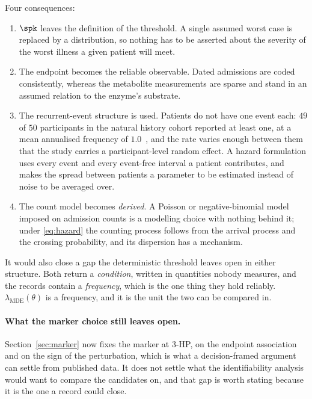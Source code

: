 Four consequences:

\begin{enumerate}[leftmargin=*, itemsep=2pt]
\item $\spk$ leaves the definition of the threshold. A single assumed worst case is
      replaced by a distribution, so nothing has to be asserted about the severity of the
      worst illness a given patient will meet.
\item The endpoint becomes the reliable observable. Dated admissions are coded
      consistently, whereas the metabolite measurements are sparse and stand in an assumed
      relation to the enzyme's substrate.
\item The recurrent-event structure is used. Patients do not have one
      event each: $49$ of $50$ participants in the natural history cohort reported at least
      one, at a mean annualised frequency of $1.0$~\cite{natural_history}, %
      and the rate varies enough between them that the study carries a participant-level
      random effect. A hazard formulation uses every event and every event-free interval a
      patient contributes, and makes the spread between patients a parameter to be estimated
      instead of noise to be averaged over.
\item The count model becomes \emph{derived}. A Poisson or
      negative-binomial model imposed on admission counts is a modelling choice with
      nothing behind it; under \eqref{eq:hazard} the counting process follows from the
      arrival process and the crossing probability, and its dispersion has a mechanism.
\end{enumerate}

It would also close a gap the deterministic threshold leaves open in either structure. Both
return a \emph{condition}, written in quantities nobody measures, and the records contain a
\emph{frequency}, which is the one thing they hold reliably. $\lambda_{\mathrm{MDE}}(\theta)$
is a frequency, and it is the unit the two can be compared in.

\paragraph{What the marker choice still leaves open.} Section~\ref{sec:marker} now fixes the
marker at 3-HP, on the endpoint association and on the sign of the perturbation, which is
what a decision-framed argument can settle from published data. It does not settle what the
identifiability analysis would want to compare the candidates on, and that gap is worth
stating because it is the one a record could close.

